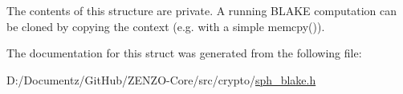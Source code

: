 The contents of this structure are private. A running B\+L\+A\+KE computation can be cloned by copying the context (e.\+g. with a simple {\ttfamily memcpy()}). 

The documentation for this struct was generated from the following file\+:\begin{DoxyCompactItemize}
\item 
D\+:/\+Documentz/\+Git\+Hub/\+Z\+E\+N\+Z\+O-\/\+Core/src/crypto/\mbox{\hyperlink{sph__blake_8h}{sph\+\_\+blake.\+h}}\end{DoxyCompactItemize}
